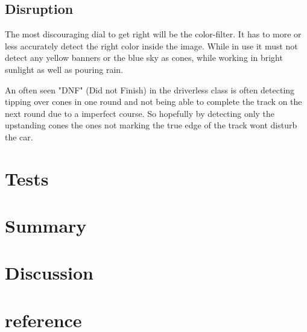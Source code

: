 \documentclass[10pt,a4paper]{article}
\begin{document}
	
	\subsection{Disruption}
	The most discouraging dial to get right will be the color-filter. It has to more or less accurately detect the right color inside the image. While in use it must not detect any yellow banners or the blue sky as cones, while working in bright sunlight as well as pouring rain.
	
	An often seen "DNF" (Did not Finish) in the driverless class is often detecting tipping over cones in one round and not being able to complete the track on the next round due to a imperfect course. So hopefully by detecting only the upstanding cones the ones not marking the true edge of the track wont disturb the car.
	
	\section{Tests}
	
	\section{Summary}
	
	\section{Discussion}
	\section{reference}
	
	\begin{thebibliography}{xxxxxxxxxxxxxxxxxxx}
	\end{thebibliography}
\end{document}
